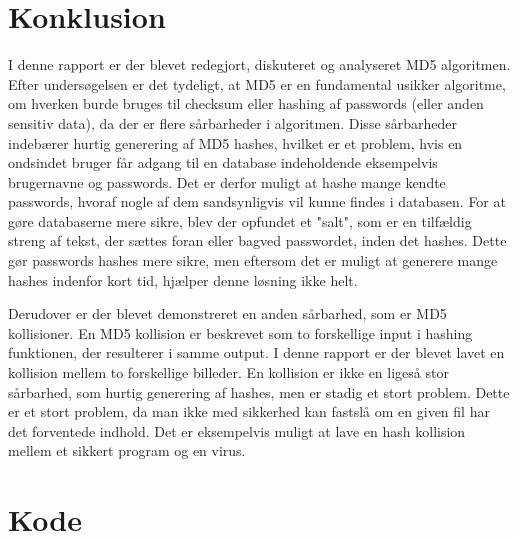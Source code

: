 \documentclass[12pt]{article}
\begin{document}
\section{Konklusion}
I denne rapport er der blevet redegjort, diskuteret og analyseret MD5 algoritmen. Efter undersøgelsen er det tydeligt, at MD5 er en fundamental usikker algoritme, om hverken burde bruges til checksum eller hashing af passwords (eller anden sensitiv data), da der er flere sårbarheder i algoritmen. Disse sårbarheder indebærer hurtig generering af MD5 hashes, hvilket er et problem, hvis en ondsindet bruger får adgang til en database indeholdende eksempelvis brugernavne og passwords. Det er derfor muligt at hashe mange kendte passwords, hvoraf nogle af dem sandsynligvis vil kunne findes i databasen. For at gøre databaserne mere sikre, blev der opfundet et "salt", som er en tilfældig streng af tekst, der sættes foran eller bagved passwordet, inden det hashes. Dette gør passwords hashes mere sikre, men eftersom det er muligt at generere mange hashes indenfor kort tid, hjælper denne løsning ikke helt. 

Derudover er der blevet demonstreret en anden sårbarhed, som er MD5 kollisioner. En MD5 kollision er beskrevet som to forskellige input i hashing funktionen, der resulterer i samme output. I denne rapport er der blevet lavet en kollision mellem to forskellige billeder. En kollision er ikke en ligeså stor sårbarhed, som hurtig generering af hashes, men er stadig et stort problem. Dette er et stort problem, da man ikke med sikkerhed kan fastslå om en given fil har det forventede indhold. Det er eksempelvis muligt at lave en hash kollision mellem et sikkert program og en virus. 





\newpage
\appendix
\section{Kode}
\end{document}
